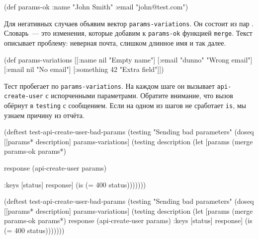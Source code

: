 \else

\begin{english}
  \begin{clojure}
(def params-ok {:name "John Smith" :email "john@test.com"})
  \end{clojure}
\end{english}

\fi

Для негативных случаев объявим вектор \verb|params-variations|. Он состоит из
пар . Словарь~--- это изменения, которые добавим к
\verb|params-ok| функцией \verb|merge|. Текст описывает проблему: неверная
почта, слишком длинное имя и так далее.

\begin{english}
  \begin{clojure}
(def params-variations
  [[{:name nil}      "Empty name"]
   [{:email "dunno"} "Wrong email"]
   [{:email nil}     "No email"]
   [{:something 42}  "Extra field"]])
  \end{clojure}
\end{english}

Тест пробегает по \verb|params-variations|. На каждом шаге он вызывает
\verb|api-create-user| с испорченными параметрами. Обратите внимание, что
вызов обёрнут в \verb|testing| с сообщением. Если на одном из шагов не
сработает \verb|is|, мы узнаем причину из отчёта.

\ifx\devicetype\mobile

\begin{english}
  \begin{clojure}
(deftest test-api-create-user-bad-params
  (testing "Sending bad parameters"
    (doseq [[params* description]
            params-variations]
      (testing description
        (let [params
              (merge params-ok params*)

              response
              (api-create-user params)
              
              {:keys [status]} response]
          (is (= 400 status)))))))
  \end{clojure}
\end{english}

\else

\begin{english}
  \begin{clojure}
(deftest test-api-create-user-bad-params
  (testing "Sending bad parameters"
    (doseq [[params* description] params-variations]
      (testing description
        (let [params (merge params-ok params*)
              response (api-create-user params)
              {:keys [status]} response]
          (is (= 400 status)))))))
  \end{clojure}
\end{english}


